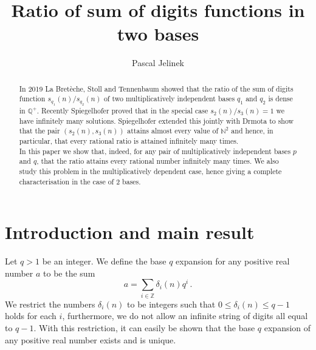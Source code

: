 \documentclass[12pt]{amsart}
\title{Ratio of sum of digits functions in two bases}
\author{Pascal Jelinek}
\renewcommand{\leq}{\leqslant}
\theoremstyle{definition}
\numberwithin{equation}{section}
\newcommand\ZZ{\mathbb{Z}}
\newcommand\NN{\mathbb{N}}
\newcommand\QQ{\mathbb{Q}}
\numberwithin{equation}{section}
\begin{document}

\begin{abstract}
	In 2019 La Bretèche, Stoll and Tennenbaum showed that the ratio of the sum of digits function $s_{q_1}(n)/s_{q_2}(n)$ of two multiplicatively independent bases $q_1$ and $q_2$ is dense in $\QQ^+$. Recently Spiegelhofer proved that in the special case $s_2(n)/s_3(n)=1$ we have infinitely many solutions. Spiegelhofer extended this jointly with Drmota to show that the pair $(s_2(n),s_3(n))$ attains almost every value of $\NN^2$ and hence, in particular, that every rational ratio is attained infinitely many times.\\
	In this paper we show that, indeed, for any pair of multiplicatively independent bases $p$ and $q$, that the ratio attains every rational number infinitely many times. We also study this problem in the multiplicatively dependent case, hence giving a complete characterisation in the case of 2 bases.
\end{abstract}
\maketitle
\tableofcontents
\renewcommand{\thefootnote}{\fnsymbol{footnote}}
\renewcommand{\thefootnote}{\arabic{footnote}}

\section{Introduction and main result}
Let $q>1$ be an integer. We define the base $q$ expansion for any positive real number $a$ to be the sum
\begin{equation}
	a= \sum_{i\in \ZZ} \delta_i(n)q^i\,.
\end{equation}
We restrict the numbers $\delta_i(n)$ to be integers such that $0\leq \delta_i(n) \leq q-1$ holds for each $i$, furthermore, we do not allow an infinite string of digits all equal to $\mathrel{{q}{-}{1}}$. With this restriction, it can easily be shown that the base $q$ expansion of any positive real number exists and is unique.
\end{document}
